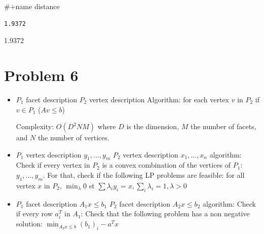 \documentclass[11pt]{article}
\begin{document}
\#+name distance
\begin{verbatim}
1.9372
\end{verbatim}


1.9372

\section{Problem 6}
\label{sec:orgheadline6}

\begin{itemize}
\item \(P_1\) facet description
\(P_2\) vertex description
Algorithm: for each vertex \(v\) in \(P_2\) if \(v \in P_1\) (\(Av \le b\))

Complexity: \(O(D^2NM)\) where \(D\) is the dimension, \(M\) the number of facets, and \(N\) the number of vertices.

\item \(P_1\) vertex description \(y_1, \ldots, y_m\)
\(P_2\) vertex description \(x_1, \ldots, x_n\)
algorithm: Check if every vertex in \(P_2\) is a convex combination of the vertices of \(P_1\): \(y_1, \ldots, y_m\). For that, check if the following LP problems are feasible: for all vertex \(x\) in \(P_2\), \(\min_{\lambda} 0\) st \(\sum \lambda_i y_i = x, \sum_i \lambda_i = 1, \lambda > 0\)

\item \(P_1\) facet description \(A_1x \le b_1\)
\(P_2\) facet description \(A_2x \le b_2\)
algorithm: Check if every row  \(a_i^T\) in \(A_1\): Check that the following problem has a non negative solution:
\(\min_{A_2x \le b} (b_1)_i - a^T x\)
\end{itemize}
\end{document}
